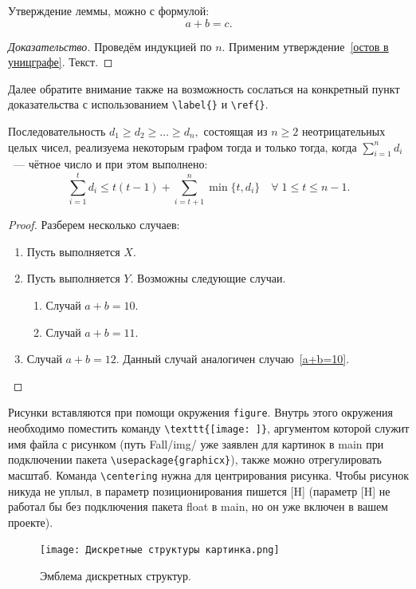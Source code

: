 \begin{lemma}
Утверждение леммы, можно с формулой: 
\[ a  + b = c.\]
\end{lemma}
\begin{proof}[Доказательство]
Проведём индукцией по $n$. Применим утверждение~\ref{остов в уницграфе}. Текст. 
\end{proof}

Далее обратите внимание также на возможность сослаться на конкретный пункт доказательства с использованием \verb'\label{}' и \verb'\ref{}'.

\begin{theorem}  \label{degree_seq_rlz}
    Последовательность $d_1\geqslant d_2 \geqslant \dots \geqslant d_n,$ состоящая из  $n\geqslant 2$ неотрицательных целых чисел, реализуема некоторым графом тогда и только тогда, когда $\sum_{i=1}^n d_i$~--- чётное число и при этом выполнено:
    \[
        \sum_{i=1}^t d_i \leqslant t(t-1) + \sum_{i=t+1}^n \min\{t, d_i\} \quad \forall \; 1 \leqslant t \leqslant n-1.
    \]
\end{theorem}
\begin{proof}
Разберем несколько случаев: 
\begin{enumerate}
    \item Пусть выполняется $X$.
    \item Пусть выполняется $Y$. Возможны следующие случаи.
    \begin{enumerate} 
        \item \label{a+b=10} Случай $a+b=10.$ 
        \item Случай $a+b=11.$ 
    \end{enumerate}
    \item Случай $a+b=12.$ Данный случай аналогичен случаю~\ref{a+b=10}.
\end{enumerate}
\end{proof}

Рисунки вставляются при помощи окружения \verb'figure'. Внутрь этого окружения необходимо 
поместить команду \verb'\texttt{[image: ]}', аргументом которой служит имя файла с рисунком (путь Fall/img/ уже заявлен для картинок в main при подключении пакета \verb'\usepackage{graphicx}'), также можно отрегулировать масштаб. 
Команда \verb'\centering' нужна для центрирования рисунка. Чтобы рисунок никуда не уплыл, в параметр позиционирования пишется [H] (параметр [H] не работал бы без подключения пакета float в main, но он уже включен в вашем проекте).

\begin{figure}[H]
\centering
\texttt{[image: Дискретные структуры картинка.png]}
\caption{Эмблема дискретных структур.} \label{эмблема ДС}
\end{figure}

